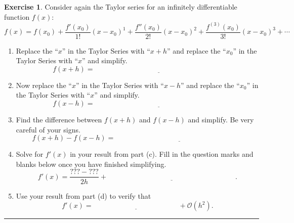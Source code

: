 \documentclass[
]{book}
\theoremstyle{definition}
\theoremstyle{definition}
\theoremstyle{definition}
\newtheorem{exercise}{Exercise}[chapter]
\theoremstyle{remark}
\begin{document}
\begin{exercise}
\protect\hypertarget{exr:unnamed-chunk-160}{}{\label{exr:unnamed-chunk-160} }Consider again the Taylor series for an infinitely differentiable function \(f(x)\):
\[ f(x) = f(x_0) + \frac{f'(x_0)}{1!} (x-x_0)^1 + \frac{f''(x_0)}{2!}(x-x_0)^2 +
        \frac{f^{(3)}(x_0)}{3!}(x-x_0)^3 + \cdots \]

\begin{enumerate}
\def\labelenumi{\alph{enumi}.}
\item
  Replace the ``\(x\)'' in the Taylor Series with ``\(x+h\)'' and replace the ``\(x_0\)'' in the Taylor Series with ``\(x\)'' and simplify.
  \[f(x+h) = \underline{\hspace{3in}}\]
\item
  Now replace the ``\(x\)'' in the Taylor Series with ``\(x-h\)'' and replace the ``\(x_0\)'' in the Taylor Series with ``\(x\)'' and simplify.
  \[f(x-h) = \underline{\hspace{3in}}\]
\item
  Find the difference between \(f(x+h)\) and \(f(x-h)\) and simplify. Be very careful of your signs.
  \[f(x+h) - f(x-h) = \underline{\hspace{3in}}\]
\item
  Solve for \(f'(x)\) in your result from part (c). Fill in the question
  marks and blanks below once you have finished simplifying.
  \[f'(x) = \frac{??? - ???}{2h} + \underline{\hspace{3in}}.\]
\item
  Use your result from part (d) to verify that
  \[f'(x) = \underline{\hspace{2in}} + \mathcal{O}(h^2).\]
\end{enumerate}
\end{exercise}

\begin{center}\rule{0.5\linewidth}{0.5pt}\end{center}
\end{document}
